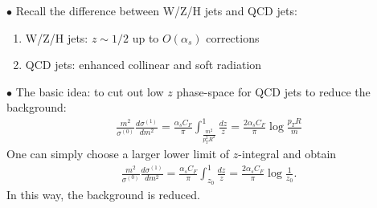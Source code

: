 \documentclass[9pt,a4paper,unknownkeysallowed,xcolor=dvipsnames,aspectratio=43]{beamer}
\begin{document}
%
%
\begin{frame}

{\color{darkred}\Large$\bullet$} Recall the difference between W/Z/H jets and QCD jets:
\vspace{2mm}
\begin{enumerate}
    \item {\color{darkred}W/Z/H jets:} $z\sim 1/2$ up to $O(\alpha_s)$ corrections
    \item{\color{darkred}QCD jets:} enhanced collinear and soft radiation 
\end{enumerate}
\vspace{2mm}

{\color{darkred}\Large$\bullet$} {\color{darkred}The basic idea:} to cut out low $z$ phase-space for QCD jets to reduce the background:
\begin{align}
\frac{m^2}{\sigma^{(0)}}\frac{d\sigma^{(1)}}{dm^2}=\frac{\alpha_s C_F}{\pi}\int_{\frac{m^2}{p_T^2 R^2}}^1\frac{dz}{z}=\frac{2\alpha_s C_F}{\pi}\log\frac{p_T R}{m}
\end{align}
One can simply choose a larger lower limit of $z$-integral and obtain
\begin{align}
\frac{m^2}{\sigma^{(0)}}\frac{d\sigma^{(1)}}{dm^2}=\frac{\alpha_s C_F}{\pi}\int_{z_0}^1\frac{dz}{z}=\frac{2\alpha_s C_F}{\pi}\log\frac{1}{z_0}.
\end{align}
In this way, the background is reduced.
\end{frame}
%
%
\end{document}
